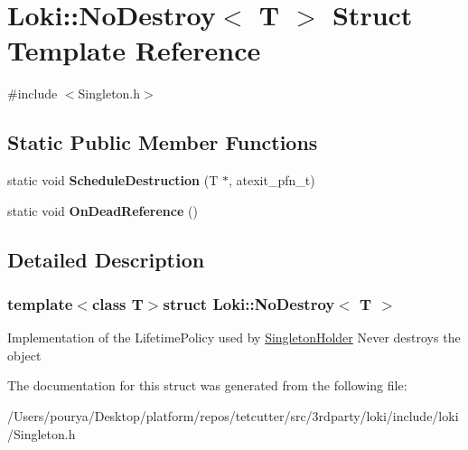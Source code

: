 \hypertarget{structLoki_1_1NoDestroy}{}\section{Loki\+:\+:No\+Destroy$<$ T $>$ Struct Template Reference}
\label{structLoki_1_1NoDestroy}


{\ttfamily \#include $<$Singleton.\+h$>$}

\subsection*{Static Public Member Functions}
\begin{DoxyCompactItemize}
\item 
\hypertarget{structLoki_1_1NoDestroy_a6c62dfcf936280a3951caba23c4312ca}{}static void {\bfseries Schedule\+Destruction} (T $\ast$, atexit\+\_\+pfn\+\_\+t)\label{structLoki_1_1NoDestroy_a6c62dfcf936280a3951caba23c4312ca}

\item 
\hypertarget{structLoki_1_1NoDestroy_a247f32f3f188838a244cce638af380f7}{}static void {\bfseries On\+Dead\+Reference} ()\label{structLoki_1_1NoDestroy_a247f32f3f188838a244cce638af380f7}

\end{DoxyCompactItemize}


\subsection{Detailed Description}
\subsubsection*{template$<$class T$>$struct Loki\+::\+No\+Destroy$<$ T $>$}

Implementation of the Lifetime\+Policy used by \hyperlink{classLoki_1_1SingletonHolder}{Singleton\+Holder} Never destroys the object 

The documentation for this struct was generated from the following file\+:\begin{DoxyCompactItemize}
\item 
/\+Users/pourya/\+Desktop/platform/repos/tetcutter/src/3rdparty/loki/include/loki/Singleton.\+h\end{DoxyCompactItemize}
